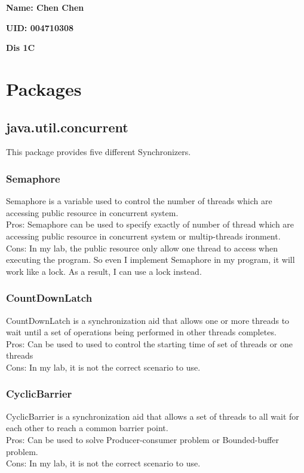 \documentclass[10pt, a4paper]{IEEEtran}
\begin{document}
    \centerline{\textbf{Name: Chen Chen}}
    \centerline{\textbf{UID: 004710308}}
    \centerline{\textbf{Dis 1C}}

    \section{Packages}
    \subsection{java.util.concurrent}
    This package provides five different Synchronizers.\\
    \subsubsection{Semaphore}
    Semaphore is a variable used to control the number of threads which are accessing public resource in concurrent system.\\
    Pros: Semaphore can be used to specify exactly of number of thread which are accessing public resource in concurrent system or multip-threads ironment. \\
    Cons: In my lab, the public resource only allow one thread to access when executing the program. So even I implement Semaphore in my program, it will work like a lock. As a result, I can use a lock instead.\\
    \subsubsection{CountDownLatch}
    CountDownLatch is a synchronization aid that allows one or more threads to wait until a set of operations being performed in other threads completes.\\
    Pros: Can be used to used to control the starting time of set of threads or one threads\\
    Cons: In my lab, it is not the correct scenario to use.\\
    \subsubsection{CyclicBarrier}
    CyclicBarrier is a synchronization aid that allows a set of threads to all wait for each other to reach a common barrier point.\\
    Pros: Can be used to solve Producer-consumer problem or Bounded-buffer problem.\\
    Cons: In my lab, it is not the correct scenario to use.\\
\end{document}
